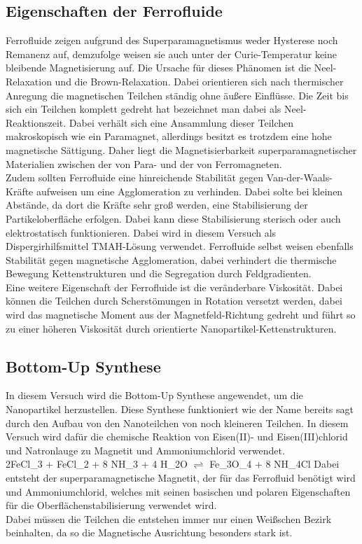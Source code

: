 \documentclass[a4paper]{TUBAFprotokoll}
\begin{document}
		\subsection{Eigenschaften der Ferrofluide}
		Ferrofluide zeigen aufgrund des Superparamagnetismus weder Hysterese noch Remanenz auf, demzufolge weisen sie auch unter der Curie-Temperatur keine bleibende Magnetisierung auf. Die Ursache für dieses Phänomen ist die Neel-Relaxation und die Brown-Relaxation. Dabei orientieren sich nach thermischer Anregung die magnetischen Teilchen ständig ohne äußere Einflüsse. Die Zeit bis sich ein Teilchen komplett gedreht hat bezeichnet man dabei als Neel-Reaktionszeit. Dabei verhält sich eine Ansammlung dieser Teilchen makroskopisch wie ein Paramagnet, allerdings besitzt es trotzdem eine hohe magnetische Sättigung. Daher liegt die Magnetisierbarkeit superparamagnetischer Materialien zwischen der von Para- und der von Ferromagneten.\\
		Zudem sollten Ferrofluide eine hinreichende Stabilität gegen Van-der-Waals-Kräfte aufweisen um eine Agglomeration zu verhinden. Dabei solte bei kleinen Abstände, da dort die Kräfte sehr groß werden, eine Stabilisierung der Partikeloberfläche erfolgen. Dabei kann diese Stabilisierung sterisch oder auch elektrostatisch funktionieren. Dabei wird in diesem Versuch als Dispergirhilfsmittel TMAH-Lösung verwendet. Ferrofluide selbst weisen ebenfalls Stabilität gegen magnetische Agglomeration, dabei verhindert die thermische Bewegung Kettenstrukturen und die Segregation durch Feldgradienten. \\
		Eine weitere Eigenschaft der Ferrofluide ist die veränderbare Viskosität. Dabei können die Teilchen durch Scherstömungen in Rotation versetzt werden, dabei wird das magnetische Moment aus der Magnetfeld-Richtung gedreht und führt so zu einer höheren Viskosität durch orientierte Nanopartikel-Kettenstrukturen.
		
		\subsection{Bottom-Up Synthese}
		In diesem Versuch wird die Bottom-Up Synthese angewendet, um die Nanopartikel herzustellen. Diese Synthese funktioniert wie der Name bereits sagt durch den Aufbau von den Nanoteilchen von noch kleineren Teilchen. In diesem Versuch wird dafür die chemische Reaktion von Eisen(II)- und Eisen(III)chlorid und Natronlauge zu Magnetit und Ammoniumchlorid verwendet. \\
		2FeCl_{3} + FeCl_{2} + 8 NH_{3} + 4 H_{2}O $\rightleftharpoons$ Fe_{3}O_{4} + 8 NH_{4}Cl
		Dabei entsteht der superparamagnetische Magnetit, der für das Ferrofluid benötigt wird und Ammoniumchlorid, welches mit seinen basischen und polaren Eigenschaften für die Oberflächenstabilisierung verwendet wird.\\ Dabei müssen die Teilchen die entstehen immer nur einen Weißschen Bezirk beinhalten, da so die Magnetische Ausrichtung besonders stark ist.
		
\end{document}
